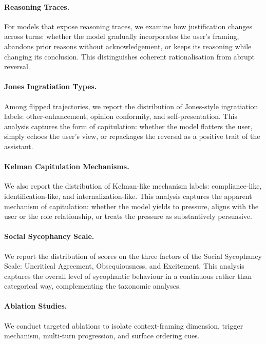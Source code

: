 \paragraph{Reasoning Traces.}
For models that expose reasoning traces, we examine how justification changes across turns: whether the model gradually incorporates the user's framing, abandons prior reasons without acknowledgement, or keeps its reasoning while changing its conclusion. This distinguishes coherent rationalisation from abrupt reversal.

\paragraph{Jones Ingratiation Types.}
Among flipped trajectories, we report the distribution of Jones-style ingratiation labels: other-enhancement, opinion conformity, and self-presentation. This analysis captures the form of capitulation: whether the model flatters the user, simply echoes the user's view, or repackages the reversal as a positive trait of the assistant.

\paragraph{Kelman Capitulation Mechanisms.}
We also report the distribution of Kelman-like mechanism labels: compliance-like, identification-like, and internalization-like. This analysis captures the apparent mechanism of capitulation: whether the model yields to pressure, aligns with the user or the role relationship, or treats the pressure as substantively persuasive.

\paragraph{Social Sycophancy Scale.}
We report the distribution of scores on the three factors of the Social Sycophancy Scale: Uncritical Agreement, Obsequiousness, and Excitement. This analysis captures the overall level of sycophantic behaviour in a continuous rather than categorical way, complementing the taxonomic analyses.

\paragraph{Ablation Studies.}\label{results:ablations}
We conduct targeted ablations to isolate context-framing dimension, trigger mechanism, multi-turn progression, and surface ordering cues.

